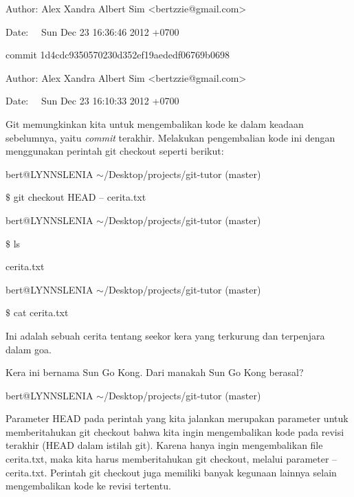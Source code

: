 \noindent 
{\fontsize{10pt}{10pt}\selectfont Author: Alex Xandra Albert Sim <bertzzie@gmail.com>} \par
\noindent 
{\fontsize{10pt}{10pt}\selectfont Date:~~ Sun Dec 23 16:36:46 2012 +0700} \par
\noindent 
{\fontsize{10pt}{10pt}\selectfont commit 1d4cdc9350570230d352ef19aededf06769b0698} \par
\noindent 
{\fontsize{10pt}{10pt}\selectfont Author: Alex Xandra Albert Sim <bertzzie@gmail.com>} \par
\noindent 
{\fontsize{10pt}{10pt}\selectfont Date:~~ Sun Dec 23 16:10:33 2012 +0700} \par
\noindent 

\vspace{12pt}
\hspace*{0.50in} Git memungkinkan kita untuk mengembalikan kode ke dalam keadaan sebelumnya, yaitu \emph{commit} terakhir. Melakukan pengembalian kode ini dengan menggunakan perintah git checkout seperti berikut: \par
\noindent 
bert@LYNNSLENIA  $  \sim  $/Desktop/projects/git-tutor (master) \par
\noindent 
 $  \$  $ git checkout HEAD -- cerita.txt \par
\noindent 
bert@LYNNSLENIA  $  \sim  $/Desktop/projects/git-tutor (master) \par
\noindent 
 $  \$  $ ls \par
\noindent 
cerita.txt \par
\noindent 
bert@LYNNSLENIA  $  \sim  $/Desktop/projects/git-tutor (master) \par
\noindent 
 $  \$  $ cat cerita.txt \par
\noindent 
Ini adalah sebuah cerita tentang seekor kera yang terkurung dan terpenjara dalam goa. \par
\noindent 
Kera ini bernama Sun Go Kong. Dari manakah Sun Go Kong berasal? \par
\noindent 
bert@LYNNSLENIA  $  \sim  $/Desktop/projects/git-tutor (master) \par
\vspace{12pt}
\hspace*{0.50in} Parameter HEAD pada perintah yang kita jalankan merupakan parameter untuk memberitahukan git checkout bahwa kita ingin mengembalikan kode pada revisi terakhir (HEAD dalam istilah git). Karena hanya ingin mengembalikan file cerita.txt, maka kita harus memberitahukan git checkout, melalui parameter -- cerita.txt. Perintah git checkout juga memiliki banyak kegunaan lainnya selain mengembalikan kode ke revisi tertentu.  \par
